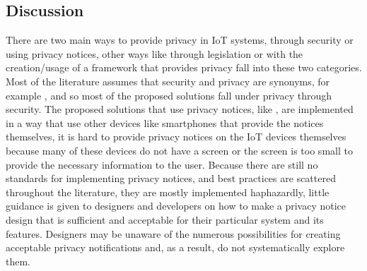 \documentclass[conference]{IEEEtran}
\begin{document}

\subsection{Discussion}

There are two main ways to provide privacy in IoT systems, through security
or using privacy notices, other ways like through legislation or with the
creation/usage of a framework that provides privacy fall into these two
categories. Most of the literature assumes that security and privacy are
synonyms, for example \cite{opara2022framework, FabianoInternet, SunSecure},
and so most of the proposed solutions fall under privacy through security.
The proposed solutions that use privacy notices, like \cite{FengDesign}, are
implemented in a way that use other devices like smartphones that provide
the notices themselves, it is hard to provide privacy notices on the IoT devices
themselves because many of these devices do not have a screen or the screen
is too small to provide the necessary information to the user. Because there
are still no standards for implementing privacy notices, and best practices
are scattered throughout the literature, they are mostly implemented haphazardly,
little guidance is given to designers and developers on how to make a privacy
notice design that is sufficient and acceptable for their particular system
and its features. Designers may be unaware of the numerous possibilities for
creating acceptable privacy notifications and, as a result, do not systematically
explore them.
\end{document}
